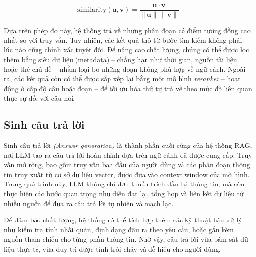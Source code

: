 \[
    \mathrm{similarity}(\mathbf{u},\mathbf{v})
    = \frac{\mathbf{u}\cdot\mathbf{v}}{\lVert \mathbf{u} \rVert \, \lVert \mathbf{v} \rVert}
\]

Dựa trên phép đo này, hệ thống trả về những phân đoạn có điểm tương đồng cao nhất so với truy vấn. Tuy nhiên, các kết quả thô từ bước tìm kiếm không phải lúc nào cũng chính xác tuyệt đối. Để nâng cao chất lượng, chúng có thể được lọc thêm bằng {siêu dữ liệu} {(metadata)} -- chẳng hạn như thời gian, nguồn tài liệu hoặc thẻ chủ đề -- nhằm loại bỏ những đoạn không phù hợp về ngữ cảnh. Ngoài ra, các kết quả còn có thể được sắp xếp lại bằng một mô hình \emph{reranker} -- hoạt động ở cấp độ câu hoặc đoạn -- để tối ưu hóa thứ tự trả về theo mức độ liên quan thực sự đối với câu hỏi.

\subsection{Sinh câu trả lời}

{Sinh câu trả lời} \emph{(Answer generation)} là thành phần cuối cùng của hệ thống RAG, nơi LLM tạo ra câu trả lời hoàn chỉnh dựa trên ngữ cảnh đã được cung cấp. Truy vấn mở rộng, bao gồm truy vấn ban đầu của người dùng và các phân đoạn thông tin truy xuất từ cơ sở dữ liệu vector, được đưa vào context window của mô hình. Trong quá trình này, LLM không chỉ đơn thuần trích dẫn lại thông tin, mà còn thực hiện các bước quan trọng như diễn đạt lại, tổng hợp và liên kết dữ liệu từ nhiều nguồn để đưa ra câu trả lời tự nhiên và mạch lạc.

Để đảm bảo chất lượng, hệ thống có thể tích hợp thêm các kỹ thuật hậu xử lý như kiểm tra tính nhất quán, định dạng đầu ra theo yêu cầu, hoặc gắn kèm nguồn tham chiếu cho từng phần thông tin. Nhờ vậy, câu trả lời vừa bám sát dữ liệu thực tế, vừa duy trì được tính trôi chảy và dễ hiểu cho người dùng.
